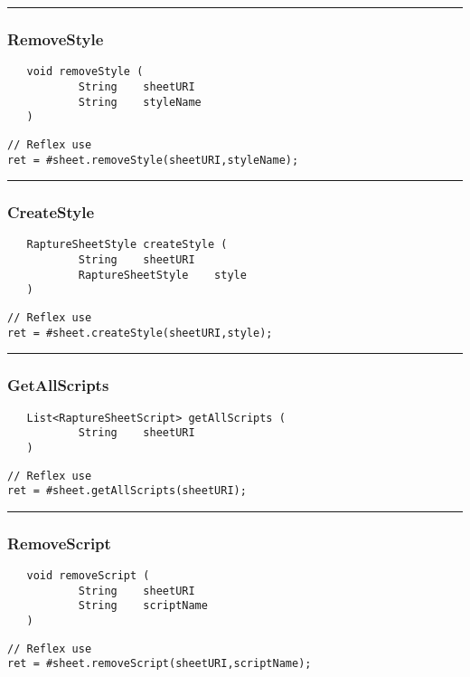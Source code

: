 \rule{15cm}{2pt}
\subsubsection{RemoveStyle}
\label{Api:RemoveStyle}
\begin{verbatim}
   void removeStyle (
           String    sheetURI
           String    styleName
   )
\end{verbatim}
\begin{lstlisting}[language=reflex]
// Reflex use
ret = #sheet.removeStyle(sheetURI,styleName);
\end{lstlisting}



\rule{15cm}{2pt}
\subsubsection{CreateStyle}
\label{Api:CreateStyle}
\begin{verbatim}
   RaptureSheetStyle createStyle (
           String    sheetURI
           RaptureSheetStyle    style
   )
\end{verbatim}
\begin{lstlisting}[language=reflex]
// Reflex use
ret = #sheet.createStyle(sheetURI,style);
\end{lstlisting}



\rule{15cm}{2pt}
\subsubsection{GetAllScripts}
\label{Api:GetAllScripts}
\begin{verbatim}
   List<RaptureSheetScript> getAllScripts (
           String    sheetURI
   )
\end{verbatim}
\begin{lstlisting}[language=reflex]
// Reflex use
ret = #sheet.getAllScripts(sheetURI);
\end{lstlisting}



\rule{15cm}{2pt}
\subsubsection{RemoveScript}
\label{Api:RemoveScript}
\begin{verbatim}
   void removeScript (
           String    sheetURI
           String    scriptName
   )
\end{verbatim}
\begin{lstlisting}[language=reflex]
// Reflex use
ret = #sheet.removeScript(sheetURI,scriptName);
\end{lstlisting}



